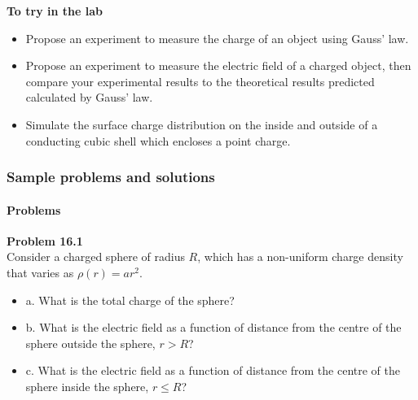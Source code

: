 \begin{framed}
\textbf{To try in the lab}\\
\begin{itemize}
\item Propose an experiment to measure the charge of an object using Gauss' law.
\item Propose an experiment to measure the electric field of a charged object, then compare your experimental results to the theoretical results predicted calculated by Gauss' law.
\item Simulate the surface charge distribution on the inside and outside of a conducting cubic shell which encloses a point charge.
\end{itemize}
\end{framed}

\subsubsection{Sample problems and solutions}

\paragraph{Problems}

\begin{framed}
\textbf{Problem 16.1}\\
Consider a charged sphere of radius $R$, which has a non-uniform charge density that varies as $\rho(r) = ar^2$.

\begin{itemize}
\item a.  What is the total charge of the sphere?
\item b. What is the electric field as a function of distance from the centre of the sphere outside the sphere, $r>R$?
\item c. What is the electric field as a function of distance from the centre of the sphere inside the sphere, $r\leq R$?
\end{itemize}
\end{framed}

